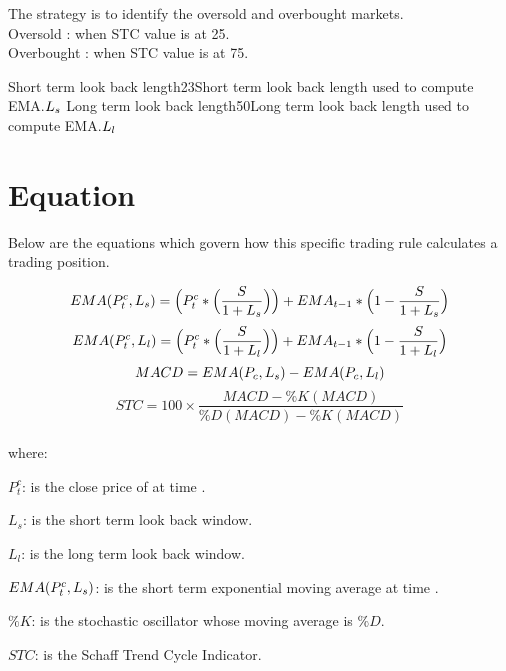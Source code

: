\documentclass{article}
\begin{document}
\logo
{} %
\tblofcontents


\howtotrade
{The strategy is to identify the oversold and overbought markets.\\
Oversold : when STC value is at 25. \\
Overbought : when STC value is at 75. \\
}

{Short term look back length}{23}{Short term look back length used to compute EMA.}{$L_{s}$}
{Long term look back length}{50}{Long term look back length used to compute EMA.}{$L_{l}$}
\stoptable %

\newpage
\section{Equation}
Below are the equations which govern how this specific trading rule calculates a trading position.

\begin{equation}
    EMA(P_{t}^{c}, L_{s}) = \Big(P_{t}^{c} * \Big(\frac{S}{1 + L_{s}}\Big)\Big) + EMA_{t-1} * \Big(1-\frac{S}{1 + L_{s}}\Big)
\end{equation}
\begin{equation}
    EMA(P_{t}^{c}, L_{l}) = \Big(P_{t}^{c} * \Big(\frac{S}{1 + L_{l}}\Big)\Big) + EMA_{t-1} * \Big(1-\frac{S}{1 + L_{l}}\Big)
\end{equation}
\begin{equation}
    MACD = EMA(P_{c}, L_{s}) - EMA(P_{c}, L_{l})
\end{equation}
\begin{equation}
    STC = 100 \times \frac{MACD - \%K(MACD)}{\%D(MACD) - \%K(MACD)}
\end{equation}
\\ %
where:

$P_{t}^{c}$: is the close price of at time \currenttime.

$L_{s}$: is the short term look back window.

$L_{l}$: is the long term look back window.

$EMA(P_{t}^{c}, L_{s})$: is the short term exponential moving average at time \currenttime.

$\%K$: is the stochastic oscillator whose moving average is $\%D$.

$STC$: is the Schaff Trend Cycle Indicator.

\keyterms
\furtherlinks %
\end{document}
